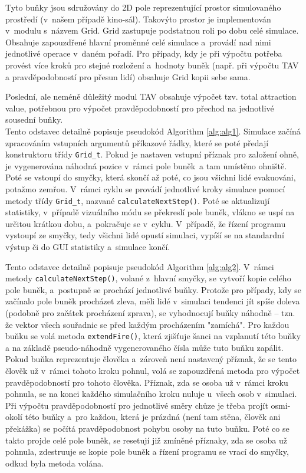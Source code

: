 \documentclass[11pt, titlepage, a4paper]{article}
\begin{document}
    Tyto buňky jsou sdružovány do 2D pole reprezentující prostor simulovaného prostředí (v~našem případě kino-sál). Takovýto prostor je implementován v~modulu s~názvem Grid. Grid zastupuje podstatnou roli po dobu celé simulace. Obsahuje zapouzdřené hlavní proměnné celé simulace a~provádí nad nimi jednotlivé operace v~daném pořadí. Pro případy, kdy je při výpočtu potřeba provést více kroků pro stejné rozložení a~hodnoty buněk (např. při výpočtu TAV a pravděpodobností pro přesun lidí) obsahuje Grid kopii sebe sama.
    
    Poslední, ale neméně důležitý modul TAV obsahuje výpočet tzv. total attraction value, potřebnou pro výpočet pravděpodobností pro přechod na jednotlivé sousední buňky. \\
    
    Tento odstavec detailně popisuje pseudokód Algorithm \ref{alg:alg1}. Simulace začíná zpracováním vstupních argumentů příkazové řádky, které se poté předají konstruktoru třídy \texttt{Grid\_t}. Pokud je nastaven vstupní příznak pro založení ohně, je vygenerována náhodná pozice v~rámci pole buněk~a tam umístěno ohniště. Poté se vstoupí do smyčky, která skončí až poté, co jsou všichni lidé evakuováni, potažmo zemřou. V~rámci cyklu se provádí jednotlivé kroky simulace pomocí metody třídy \texttt{Grid\_t}, nazvané \texttt{calculateNextStep()}. Poté se aktualizují statistiky, v~případě vizuálního módu se překreslí pole buněk, vlákno se uspí na určitou krátkou dobu, a~pokračuje se v~cyklu. V~případě, že řízení programu vystoupí ze smyčky, tedy všichni lidé opustí simulaci, vypíší se na standardní výstup či do GUI statistiky a~simulace končí.
    
    Tento odstavec detailně popisuje pseudokód Algorithm \ref{alg:alg2}. V~rámci metody \texttt{calculateNextStep()}, volané z~hlavní smyčky, se vytvoří kopie celého pole buněk, a~postupně se prochází jednotlivé buňky. Protože pro případy, kdy se začínalo pole buněk procházet zleva, měli lidé v~simulaci tendenci jít spíše doleva (podobně pro začátek procházení zprava), se vyhodnocují buňky náhodně -- tzn. že vektor všech souřadnic se před každým procházením "zamíchá". Pro každou buňku se volá metoda \texttt{extendFire()}, která zjišťuje šanci na vzplanutí této buňky a na základě pseudo-náhodně vygenerovaného čísla může tuto buňku zapálit. Pokud buňka reprezentuje člověka a~zároveň není nastavený příznak, že se tento člověk už v~rámci tohoto kroku pohnul, volá se zapouzdřená metoda pro výpočet pravděpodobností pro tohoto člověka. Příznak, zda se osoba už v~rámci kroku pohnula, se na konci každého simulačního kroku nuluje u~všech osob v~simulaci. Při výpočtu pravděpodobností pro jednotlivé směry chůze je třeba projít osmi-okolí této buňky a~pro každou, která je prázdná (není tam stěna, člověk ani překážka) se počítá pravděpodobnost pohybu osoby na tuto buňku. Poté co se takto projde celé pole buněk, se resetují již zmíněné příznaky, zda se osoba už pohnula, zdestruuje se kopie pole buněk a řízení programu se vrací do smyčky, odkud byla metoda volána.
    
\end{document}
